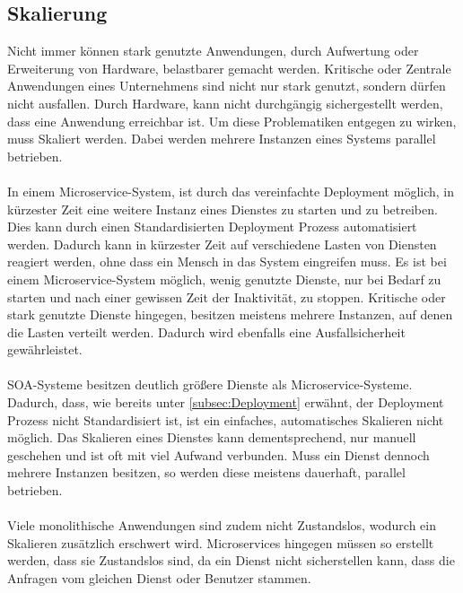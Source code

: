\subsection{Skalierung}
\label{subsec:Skalierung}
Nicht immer können stark genutzte Anwendungen, durch Aufwertung oder Erweiterung von Hardware, belastbarer gemacht werden. Kritische oder Zentrale Anwendungen eines Unternehmens sind nicht nur stark genutzt, sondern dürfen nicht ausfallen. Durch Hardware, kann nicht durchgängig sichergestellt werden, dass eine Anwendung erreichbar ist. Um diese Problematiken entgegen zu wirken, muss Skaliert werden. Dabei werden mehrere Instanzen eines Systems parallel betrieben.
\\\\
In einem Microservice-System, ist durch das vereinfachte Deployment möglich, in kürzester Zeit eine weitere Instanz eines Dienstes zu starten und zu betreiben. Dies kann durch einen Standardisierten Deployment Prozess automatisiert werden. Dadurch kann in kürzester Zeit auf verschiedene Lasten von Diensten reagiert werden, ohne dass ein Mensch in das System eingreifen muss. Es ist bei einem Microservice-System möglich, wenig genutzte Dienste, nur bei Bedarf zu starten und nach einer gewissen Zeit der Inaktivität, zu stoppen. Kritische oder stark genutzte Dienste hingegen, besitzen meistens mehrere Instanzen, auf denen die Lasten verteilt werden. Dadurch wird ebenfalls eine Ausfallsicherheit gewährleistet.
\\\\
SOA-Systeme besitzen deutlich größere Dienste als Microservice-Systeme. Dadurch, dass, wie bereits unter \ref{subsec:Deployment}  erwähnt, der Deployment Prozess nicht Standardisiert ist, ist ein einfaches, automatisches Skalieren nicht möglich. Das Skalieren eines Dienstes kann dementsprechend, nur manuell geschehen und ist oft mit viel Aufwand verbunden. Muss ein Dienst dennoch mehrere Instanzen besitzen, so werden diese meistens dauerhaft, parallel betrieben.
\\\\
Viele monolithische Anwendungen sind zudem nicht Zustandslos, wodurch ein Skalieren zusätzlich erschwert wird. Microservices hingegen müssen so erstellt werden, dass sie Zustandslos sind, da ein Dienst nicht sicherstellen kann, dass die Anfragen vom gleichen Dienst oder Benutzer stammen.

